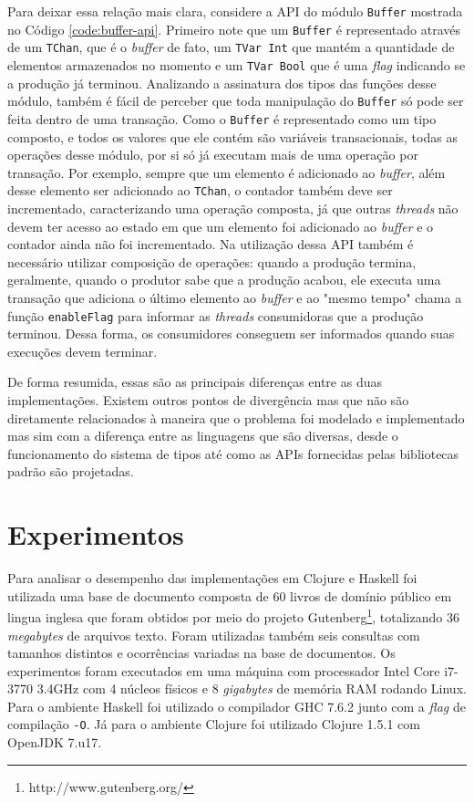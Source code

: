 Para deixar essa relação mais clara, considere a API do módulo \verb|Buffer| mostrada no Código \ref{code:buffer-api}. Primeiro note que um \verb|Buffer| é representado através de um \verb|TChan|, que é o \emph{buffer} de fato, um \verb|TVar Int| que mantém a quantidade de elementos armazenados no momento e um \verb|TVar Bool| que é uma \emph{flag} indicando se a produção já terminou. Analizando a assinatura dos tipos das funções desse módulo, também é fácil de perceber que toda manipulação do \verb|Buffer| só pode ser feita dentro de uma transação. Como o \verb|Buffer| é representado como um tipo composto, e todos os valores que ele contém são variáveis transacionais, todas as operações desse módulo, por si só já executam mais de uma operação por transação. Por exemplo, sempre que um elemento é adicionado ao \emph{buffer}, além desse elemento ser adicionado ao \verb|TChan|, o contador também deve ser incrementado, caracterizando uma operação composta, já que outras \emph{threads} não devem ter acesso ao estado em que um elemento foi adicionado ao \emph{buffer} e o contador ainda não foi incrementado. Na utilização dessa API também é necessário utilizar composição de operações: quando a produção termina, geralmente, quando o produtor sabe que a produção acabou, ele executa uma transação que adiciona o último elemento ao \emph{buffer} e ao "mesmo tempo" chama a função \verb|enableFlag| para informar as \emph{threads} consumidoras que a produção terminou. Dessa forma, os consumidores conseguem ser informados quando suas execuções devem terminar.

De forma resumida, essas são as principais diferenças entre as duas implementações. Existem outros pontos de divergência mas que não são diretamente relacionados à maneira que o problema foi modelado e implementado mas sim com a diferença entre as linguagens que são diversas, desde o funcionamento do sistema de tipos até como as APIs fornecidas pelas bibliotecas padrão são projetadas.


\section{Experimentos}

Para analisar o desempenho das implementações em Clojure e Haskell foi utilizada uma base de documento composta de 60 livros de domínio público em lingua inglesa que foram obtidos por meio do projeto Gutenberg\footnote{http://www.gutenberg.org/}, totalizando 36 \emph{megabytes} de arquivos texto. Foram utilizadas também seis consultas com tamanhos distintos e ocorrências variadas na base de documentos. Os experimentos foram executados em uma máquina com processador Intel Core i7-3770 3.4GHz com 4 núcleos físicos e 8 \emph{gigabytes} de memória RAM rodando Linux. Para o ambiente Haskell foi utilizado o compilador GHC 7.6.2 junto com a \emph{flag} de compilação \verb|-O|. Já para o ambiente Clojure foi utilizado Clojure 1.5.1 com OpenJDK 7.u17.

